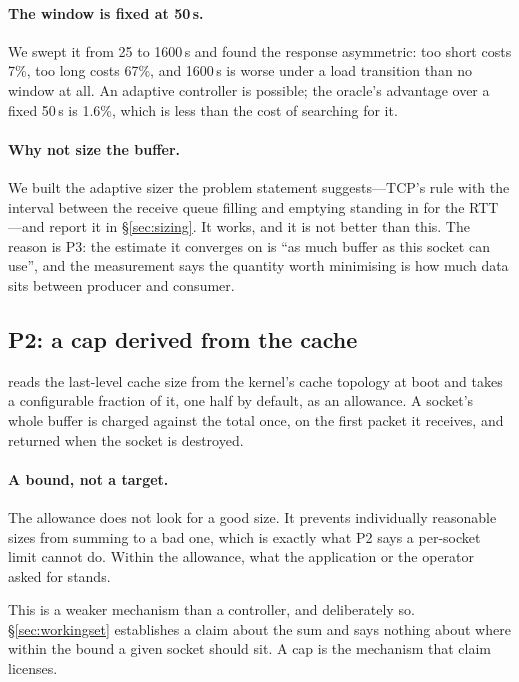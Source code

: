 \paragraph{The window is fixed at 50\,\textmu s.} We swept it from 25 to
1600\,\textmu s and found the response asymmetric: too short costs 7\%, too long
costs 67\%, and 1600\,\textmu s is worse under a load transition than no window
at all. An adaptive controller is possible; the oracle's advantage over a fixed
50\,\textmu s is 1.6\%, which is less than the cost of searching for it.

\paragraph{Why not size the buffer.} We built the adaptive sizer the problem
statement suggests---TCP's rule with the interval between the receive queue
filling and emptying standing in for the RTT---and report it in
\S\ref{sec:sizing}. It works, and it is not better than this. The reason is P3:
the estimate it converges on is ``as much buffer as this socket can use'', and
the measurement says the quantity worth minimising is how much data sits between
producer and consumer.

\subsection{P2: a cap derived from the cache}
\label{sec:d-cap}

\sys reads the last-level cache size from the kernel's cache topology at boot
and takes a configurable fraction of it, one half by default, as an allowance. A
socket's whole buffer is charged against the total once, on the first packet it
receives, and returned when the socket is destroyed.

\paragraph{A bound, not a target.} The allowance does not look for a good size.
It prevents individually reasonable sizes from summing to a bad one, which is
exactly what P2 says a per-socket limit cannot do. Within the allowance, what
the application or the operator asked for stands.

This is a weaker mechanism than a controller, and deliberately so.
\S\ref{sec:workingset} establishes a claim about the sum and says nothing about
where within the bound a given socket should sit. A cap is the mechanism that
claim licenses.

